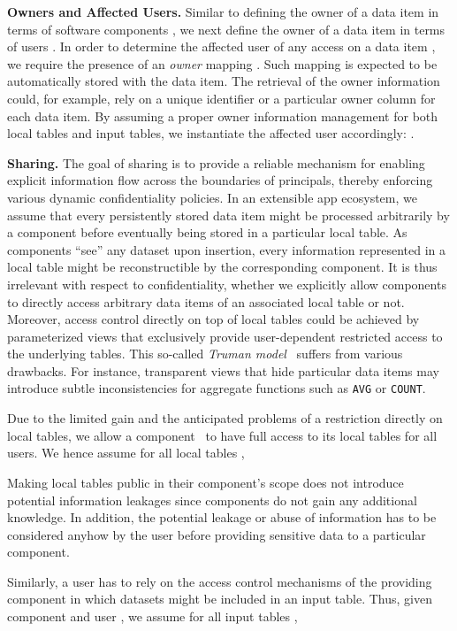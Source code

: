 \documentclass{src/acm_proc_article-sp} \else
\newcommand\myparagraph[1]{\medskip\noindent\textbf{#1.}}
\begin{document}
\myparagraph{Owners and Affected Users}
Similar to defining the owner of a data item in terms of
software components , we next define the owner of a
data item in terms of users . In order to determine the
affected user of any access on a data item , we
require the presence of an
\emph{owner} mapping
.
Such mapping is expected to be automatically stored with the
data item. The retrieval of the owner information could, for
example, rely on a unique identifier or a particular
owner column for each data item.
By assuming a proper owner information management for both local
tables and input tables, we instantiate the affected user accordingly:
.

\myparagraph{Sharing}
The goal of sharing is to provide a reliable mechanism for enabling
explicit information flow across the boundaries of principals,
thereby enforcing various dynamic confidentiality policies.
In an extensible app ecosystem, we assume that every persistently
stored data item might be processed arbitrarily by a component before
eventually being stored in a particular local table. As components
``see'' any dataset upon insertion, every information represented in
a local table might be reconstructible by the corresponding
component. It is thus irrelevant with respect to confidentiality,
whether we explicitly allow components to directly access arbitrary
data items of an associated local table or not. Moreover, access
control directly on top of local tables could be achieved by
pa\-ram\-e\-ter\-ized views that exclusively provide user-dependent
restricted access to the underlying tables. This so-called
\emph{Truman model}~\cite{Rizvi2004:QueryRewriting} suffers from
various drawbacks. For instance, transparent views that hide
particular data items may introduce subtle inconsistencies for
aggregate functions such as \texttt{AVG} or \texttt{COUNT}.

Due to the limited gain and the anticipated problems of a restriction
directly on local tables, we allow a component~ to have full
access to its local tables for all users. We hence assume for all
local tables ,

Making local tables public in their component's scope does not
introduce potential information leakages since components do not gain any additional knowledge. In addition,
the potential leakage or abuse of information has to be considered
anyhow by the user before providing sensitive data to a particular
component.



  Similarly, a user has to rely on the access control mechanisms of
  the providing component in which datasets might be included in an
  input table.
  Thus, given component  and user , we assume
  for all input tables ,
  
\end{document}
